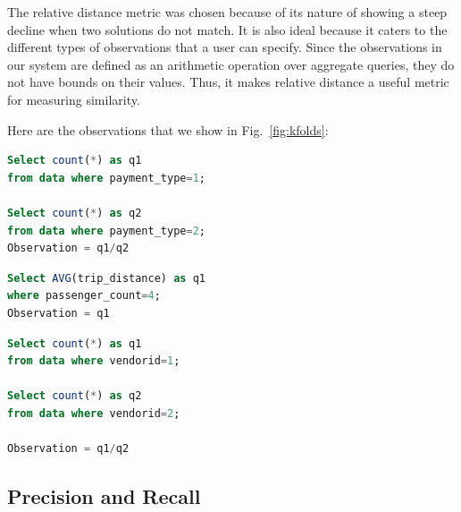 The relative distance metric was chosen because of its nature of showing a steep decline when two solutions do not match. It is also ideal because it caters to the different types of observations that a user can specify. Since the observations in our system are defined as an arithmetic operation over aggregate queries, they do not have bounds on their values. Thus, it makes relative distance a useful metric for measuring similarity.

Here are the observations that we show in Fig.~\ref{fig:kfolds}:
\renewcommand{\lstlistingname}{Query}%
\begin{lstlisting}[language=SQL, caption=o1 for Fig.~\ref{fig:kfolds}, label=qry:o1]
Select count(*) as q1 
from data where payment_type=1;

Select count(*) as q2 
from data where payment_type=2;
Observation = q1/q2
\end{lstlisting}

\begin{lstlisting}[language=SQL, caption=o2 for Fig.~\ref{fig:kfolds}, label=qry:o2]
Select AVG(trip_distance) as q1 
where passenger_count=4;
Observation = q1
\end{lstlisting}

\begin{lstlisting}[language=SQL, caption=o3 for Fig.~\ref{fig:kfolds}, label=qry:o3]
Select count(*) as q1 
from data where vendorid=1;

Select count(*) as q2 
from data where vendorid=2;

Observation = q1/q2
\end{lstlisting}

\subsection{Precision and Recall}

